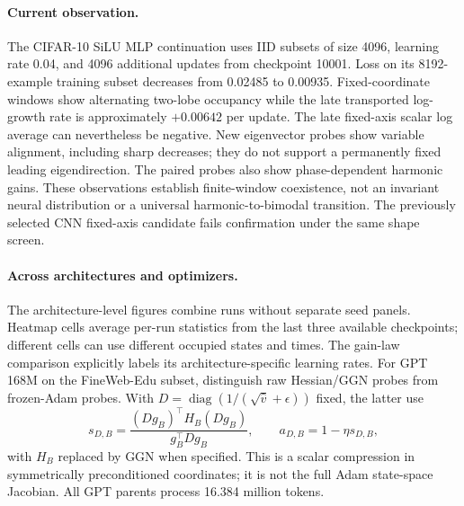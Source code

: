 \paragraph{Current observation.}
The CIFAR-10 SiLU MLP continuation uses IID subsets of size 4096, learning rate 0.04, and 4096 additional updates from checkpoint 10001. Loss on its 8192-example training subset decreases from 0.02485 to 0.00935. Fixed-coordinate windows show alternating two-lobe occupancy while the late transported log-growth rate is approximately $+0.00642$ per update. The late fixed-axis scalar log average can nevertheless be negative. New eigenvector probes show variable alignment, including sharp decreases; they do not support a permanently fixed leading eigendirection. The paired probes also show phase-dependent harmonic gains. These observations establish finite-window coexistence, not an invariant neural distribution or a universal harmonic-to-bimodal transition. The previously selected CNN fixed-axis candidate fails confirmation under the same shape screen.

\paragraph{Across architectures and optimizers.}
The architecture-level figures combine runs without separate seed panels. Heatmap cells average per-run statistics from the last three available checkpoints; different cells can use different occupied states and times. The gain-law comparison explicitly labels its architecture-specific learning rates. For GPT 168M on the FineWeb-Edu subset, distinguish raw Hessian/GGN probes from frozen-Adam probes. With $D=\operatorname{diag}(1/(\sqrt{\hat v}+\epsilon))$ fixed, the latter use
\begin{equation}
 s_{D,B}=\frac{(Dg_B)^\top H_B(Dg_B)}{g_B^\top Dg_B},\qquad a_{D,B}=1-\eta s_{D,B},
\end{equation}
with $H_B$ replaced by GGN when specified. This is a scalar compression in symmetrically preconditioned coordinates; it is not the full Adam state-space Jacobian. All GPT parents process 16.384 million tokens.

